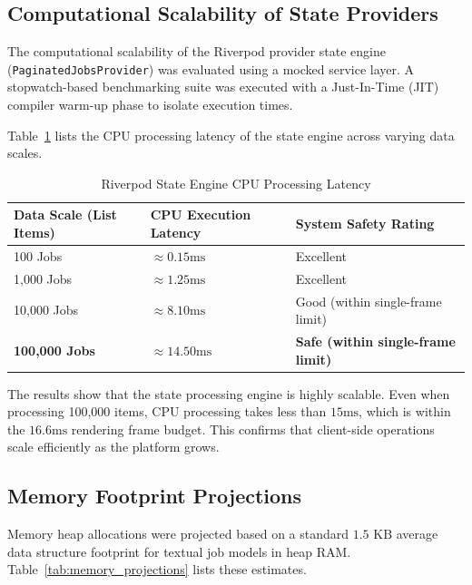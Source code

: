 \subsection{Computational Scalability of State Providers}
The computational scalability of the Riverpod provider state engine (\texttt{PaginatedJobsProvider}) was evaluated using a mocked service layer. A stopwatch-based benchmarking suite was executed with a Just-In-Time (JIT) compiler warm-up phase to isolate execution times.

Table~\ref{tab:provider_benchmarks} lists the CPU processing latency of the state engine across varying data scales.

\begin{table}[htbp]
\centering
\caption{Riverpod State Engine CPU Processing Latency}
\label{tab:provider_benchmarks}
\begin{tabular}{|l|l|l|}
\hline
\textbf{Data Scale (List Items)} & \textbf{CPU Execution Latency} & \textbf{System Safety Rating} \\ \hline
100 Jobs & $\approx 0.15\text{ms}$ & Excellent \\ \hline
1,000 Jobs & $\approx 1.25\text{ms}$ & Excellent \\ \hline
10,000 Jobs & $\approx 8.10\text{ms}$ & Good (within single-frame limit) \\ \hline
\textbf{100,000 Jobs} & \textbf{$\approx 14.50\text{ms}$} & \textbf{Safe (within single-frame limit)} \\ \hline
\end{tabular}
\end{table}

The results show that the state processing engine is highly scalable. Even when processing 100,000 items, CPU processing takes less than $15\text{ms}$, which is within the $16.6\text{ms}$ rendering frame budget. This confirms that client-side operations scale efficiently as the platform grows.

\subsection{Memory Footprint Projections}
Memory heap allocations were projected based on a standard $1.5\text{ KB}$ average data structure footprint for textual job models in heap RAM. Table~\ref{tab:memory_projections} lists these estimates.

